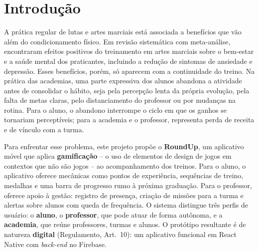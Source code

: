 %
%

\chapter{Introdução}
\label{cap:introducao}

A prática regular de lutas e artes marciais está associada a benefícios
que vão além do condicionamento físico. Em revisão sistemática com
meta-análise,  encontraram efeitos positivos do
treinamento em artes marciais sobre o bem-estar e a saúde mental dos
praticantes, incluindo a redução de sintomas de ansiedade e depressão.
Esses benefícios, porém, só aparecem com a continuidade do treino. Na
prática das academias, uma parte expressiva dos alunos abandona a
atividade antes de consolidar o hábito, seja pela percepção lenta da
própria evolução, pela falta de metas claras, pelo distanciamento do
professor ou por mudanças na rotina. Para o aluno, o abandono interrompe
o ciclo em que os ganhos se tornariam perceptíveis; para a academia e o
professor, representa perda de receita e de vínculo com a turma.

Para enfrentar esse problema, este projeto propõe o \textbf{RoundUp}, um
aplicativo móvel que aplica \textbf{gamificação} -- o uso de elementos de
design de jogos em contextos que não são jogos \cite{deterding2011} -- ao
acompanhamento dos treinos. Para o aluno, o aplicativo oferece mecânicas
como pontos de experiência, sequências de treino, medalhas e uma barra de
progresso rumo à próxima graduação. Para o professor, oferece apoio à
gestão: registro de presença, criação de missões para a turma e alertas
sobre alunos com queda de frequência. O sistema distingue três perfis de
usuário: o \textbf{aluno}, o \textbf{professor}, que pode atuar de forma
autônoma, e a \textbf{academia}, que reúne professores, turmas e alunos.
O protótipo resultante é de natureza \textbf{digital} (Regulamento,
Art.~10): um aplicativo funcional em React Native com \textit{back-end}
no Firebase.

